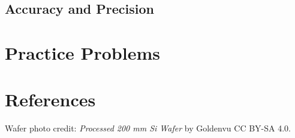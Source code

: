 \documentclass{ximera}
\begin{document}
\begin{onlineOnly}
\begin{center} 
\end{center}
\end{onlineOnly}


\subsection*{Accuracy and Precision}

\begin{onlineOnly}
\begin{center} 
\end{center}
\end{onlineOnly}





\section*{Practice Problems}

\section*{References}
Wafer photo credit: \textit{Processed 200 mm Si Wafer} by Goldenvu CC BY-SA 4.0.
\end{document}
